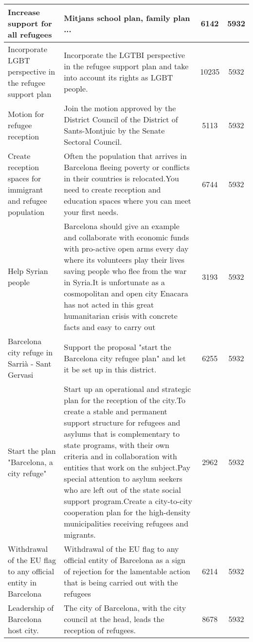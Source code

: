 \begin{spacing}{1}
\begin{longtable}{m{30mm}|m{90mm}|c @{\hskip 1mm} c}
 Increase support for all refugees & Mitjans school plan, family plan ... & 6142 & 5932 \\ \hline
 Incorporate LGBT perspective in the refugee support plan & Incorporate the LGTBI perspective in the refugee support plan and take into account its rights as LGBT people. & 10235 & 5932 \\ \hline
 Motion for refugee reception & Join the motion approved by the District Council of the District of Sants-Montjuic by the Senate Sectoral Council. & 5113 & 5932  \\ \hline
 Create reception spaces for immigrant and refugee population & Often the population that arrives in Barcelona fleeing poverty or conflicts in their countries is relocated.You need to create reception and education spaces where you can meet your first needs. & 6744 & 5932 \\ \hline
 Help Syrian people & Barcelona should give an example and collaborate with economic funds with pro-active open arms every day where its volunteers play their lives saving people who flee from the war in Syria.It is unfortunate as a cosmopolitan and open city Enacara has not acted in this great humanitarian crisis with concrete facts and easy to carry out & 3193 & 5932\\ \hline
 Barcelona city refuge in Sarrià - Sant Gervasi & Support the proposal "start the Barcelona city refugee plan" and let it be set up in this district. & 6255 & 5932 \\ \hline
 Start the plan "Barcelona, ​​a city refuge" & Start up an operational and strategic plan for the reception of the city.To create a stable and permanent support structure for refugees and asylums that is complementary to state programs, with their own criteria and in collaboration with entities that work on the subject.Pay special attention to asylum seekers who are left out of the state social support program.Create a city-to-city cooperation plan for the high-density municipalities receiving refugees and migrants. & 2962 & 5932 \\ \hline
 Withdrawal of the EU flag to any official entity in Barcelona & Withdrawal of the EU flag to any official entity of Barcelona as a sign of rejection for the lamentable action that is being carried out with the refugees & 6214 & 5932 \\ \hline
 Leadership of Barcelona host city. & The city of Barcelona, ​​with the city council at the head, leads the reception of refugees. & 8678 & 5932 \\ \hline

\end{longtable}
\end{spacing}
